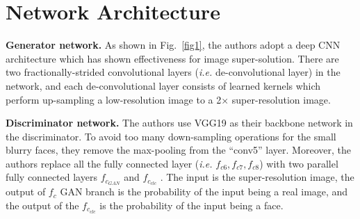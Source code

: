 \documentclass[10pt,twocolumn,letterpaper]{article}
\begin{document}
\section{Network Architecture}
\textbf{Generator network.} As shown in Fig.~\ref{fig1}, the authors
adopt a deep CNN architecture which has shown effectiveness for
image super-solution. There are two fractionally-strided convolutional layers \cite{radford2015unsupervised}
(\textit{i.e.} de-convolutional layer) in the network, and each de-convolutional layer consists of learned kernels which perform up-sampling a low-resolution image to a 2$\times$ super-resolution image.
\par
\textbf{Discriminator network.} The authors use VGG19 \cite{simonyan2014very} as their
backbone network in the discriminator. To avoid too many down-sampling operations for the
small blurry faces, they remove the max-pooling from the
``conv5'' layer. Moreover, the authors replace all the fully connected
layer (\textit{i.e.} $f_{c6},f_{c7},f_{c8}$) with two parallel fully connected layers $f_{c_{GAN}}$ and $f_{c_{clc}}$ . The input is the super-resolution
image, the output of $f_c$ GAN branch is the probability of the
input being a real image, and the output of the $f_{c_{clc}}$ is the
probability of the input being a face.

{\small
	
	
}
\end{document}
